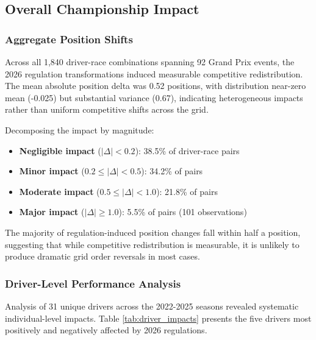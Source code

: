 \documentclass[conference]{IEEEtran}
\begin{document}
\subsection{Overall Championship Impact}

\subsubsection{Aggregate Position Shifts}

Across all 1,840 driver-race combinations spanning 92 Grand Prix events, the 2026 regulation transformations induced measurable competitive redistribution. The mean absolute position delta was 0.52 positions, with distribution near-zero mean (-0.025) but substantial variance (0.67), indicating heterogeneous impacts rather than uniform competitive shifts across the grid.

Decomposing the impact by magnitude:
\begin{itemize}
    \item \textbf{Negligible impact} ($|\Delta| < 0.2$): 38.5\% of driver-race pairs
    \item \textbf{Minor impact} ($0.2 \leq |\Delta| < 0.5$): 34.2\% of pairs
    \item \textbf{Moderate impact} ($0.5 \leq |\Delta| < 1.0$): 21.8\% of pairs
    \item \textbf{Major impact} ($|\Delta| \geq 1.0$): 5.5\% of pairs (101 observations)
\end{itemize}

The majority of regulation-induced position changes fall within half a position, suggesting that while competitive redistribution is measurable, it is unlikely to produce dramatic grid order reversals in most cases.

\subsubsection{Driver-Level Performance Analysis}

Analysis of 31 unique drivers across the 2022-2025 seasons revealed systematic individual-level impacts. Table \ref{tab:driver_impacts} presents the five drivers most positively and negatively affected by 2026 regulations.
\end{document}
